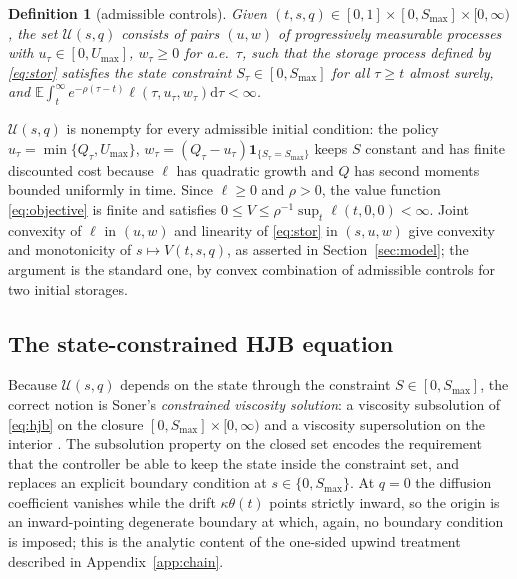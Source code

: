 \documentclass[pdflatex,sn-mathphys-num]{sn-jnl}
\theoremstyle{thmstyleone}
\theoremstyle{thmstyletwo}
\theoremstyle{thmstylethree}
\newtheorem{definition}[theorem]{Definition}
\newcommand{\dif}{\mathrm{d}}
\newcommand{\E}{\mathbb{E}}
\begin{document}
\begin{appendices}
\begin{definition}[admissible controls]
\label{def:admissible}
Given $(t,s,q)\in[0,1]\times[0,S_{\max}]\times[0,\infty)$, the set
$\mathcal U(s,q)$ consists of pairs $(u,w)$ of progressively measurable
processes with $u_\tau\in[0,U_{\max}]$, $w_\tau\ge0$ for a.e.\ $\tau$, such
that the storage process defined by \eqref{eq:stor} satisfies the state
constraint $S_\tau\in[0,S_{\max}]$ for all $\tau\ge t$ almost surely, and
$\E\int_t^\infty e^{-\rho(\tau-t)}\ell(\tau,u_\tau,w_\tau)\dif\tau<\infty$.
\end{definition}

$\mathcal U(s,q)$ is nonempty for every admissible initial condition: the
policy $u_\tau=\min\{Q_\tau,U_{\max}\}$, $w_\tau=(Q_\tau-u_\tau)
\mathbf 1_{\{S_\tau=S_{\max}\}}$ keeps $S$ constant and has finite
discounted cost because $\ell$ has quadratic growth and $Q$ has second
moments bounded uniformly in time. Since $\ell\ge0$ and $\rho>0$, the value
function \eqref{eq:objective} is finite and satisfies
$0\le V\le \rho^{-1}\sup_t\ell(t,0,0)<\infty$. Joint convexity of $\ell$ in
$(u,w)$ and linearity of \eqref{eq:stor} in $(s,u,w)$ give convexity and
monotonicity of $s\mapsto V(t,s,q)$, as asserted in
Section~\ref{sec:model}; the argument is the standard one, by convex
combination of admissible controls for two initial storages.

\subsection{The state-constrained HJB equation}
\label{app:viscosity}

Because $\mathcal U(s,q)$ depends on the state through the constraint
$S\in[0,S_{\max}]$, the correct notion is Soner's \emph{constrained
viscosity solution}: a viscosity subsolution of \eqref{eq:hjb} on the
closure $[0,S_{\max}]\times[0,\infty)$ and a viscosity supersolution on the
interior \citep{soner1986,capuzzo1990}. The subsolution property on the
closed set encodes the requirement that the controller be able to keep the
state inside the constraint set, and replaces an explicit boundary
condition at $s\in\{0,S_{\max}\}$. At $q=0$ the diffusion coefficient
vanishes while the drift $\kappa\theta(t)$ points strictly inward, so the
origin is an inward-pointing degenerate boundary at which, again, no
boundary condition is imposed; this is the analytic content of the
one-sided upwind treatment described in Appendix~\ref{app:chain}.


\end{appendices}
\end{document}
